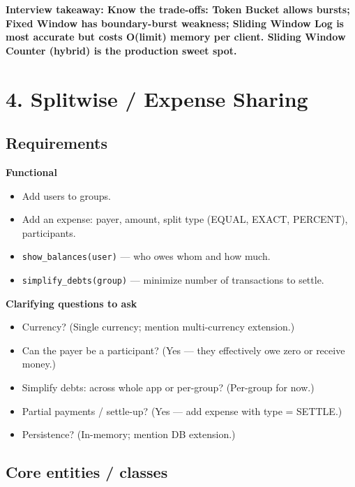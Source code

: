 \documentclass[11pt]{article}
\providecommand{\tightlist}{\setlength{\itemsep}{1pt}\setlength{\parskip}{0pt}}
\begin{document}
\textbf{Interview takeaway: Know the trade-offs: Token Bucket allows bursts; Fixed Window has boundary-burst weakness; Sliding Window Log is most accurate but costs O(limit) memory per client. Sliding Window Counter (hybrid) is the production sweet spot.}

\section{4. Splitwise / Expense Sharing}\label{4-splitwise--expense-sharing}

\subsection{Requirements}\label{requirements-3}

\textbf{Functional}

\begin{itemize}
\tightlist
\item
  Add users to groups.
\item
  Add an expense: payer, amount, split type (EQUAL, EXACT, PERCENT), participants.
\item
  \texttt{show\_balances(user)} --- who owes whom and how much.
\item
  \texttt{simplify\_debts(group)} --- minimize number of transactions to settle.
\end{itemize}

\textbf{Clarifying questions to ask}

\begin{itemize}
\tightlist
\item
  Currency? (Single currency; mention multi-currency extension.)
\item
  Can the payer be a participant? (Yes --- they effectively owe zero or receive money.)
\item
  Simplify debts: across whole app or per-group? (Per-group for now.)
\item
  Partial payments / settle-up? (Yes --- add expense with type = SETTLE.)
\item
  Persistence? (In-memory; mention DB extension.)
\end{itemize}

\subsection{Core entities / classes}\label{core-entities--classes-3}
\end{document}

